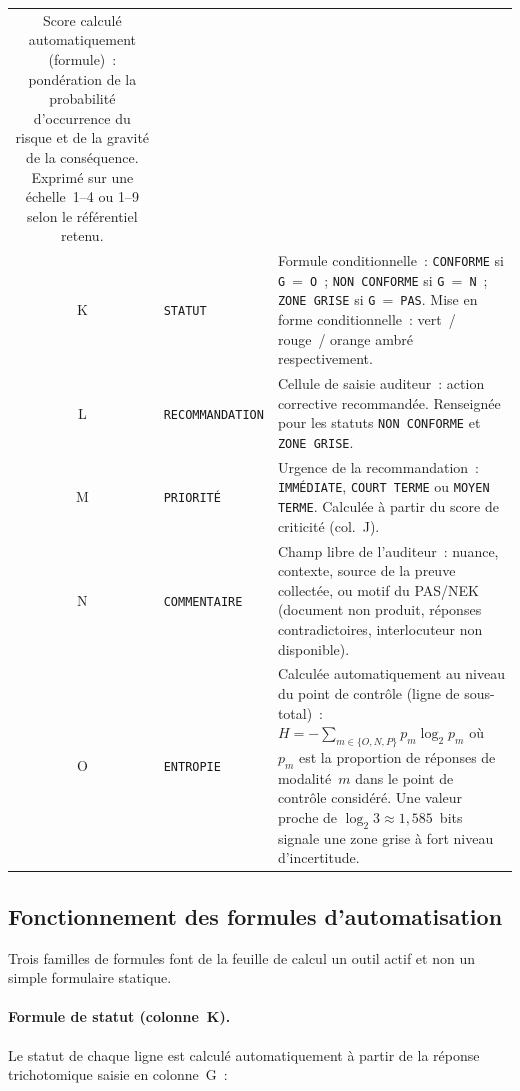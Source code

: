 \begin{table}[H]
\begin{tabular}{clp{7.5cm}}
  Score calculé automatiquement (formule)~: pondération de la
  probabilité d'occurrence du risque et de la gravité de la conséquence.
  Exprimé sur une échelle~1--4 ou 1--9 selon le référentiel retenu. \\
\addlinespace
K & \texttt{STATUT} &
  Formule conditionnelle~: \texttt{CONFORME} si \texttt{G}~=~\texttt{O}~;
  \texttt{NON~CONFORME} si \texttt{G}~=~\texttt{N}~;
  \texttt{ZONE~GRISE} si \texttt{G}~=~\texttt{PAS}.
  Mise en forme conditionnelle~: vert~/ rouge~/ orange ambré
  respectivement. \\
\addlinespace
L & \texttt{RECOMMANDATION} &
  Cellule de saisie auditeur~: action corrective recommandée. Renseignée
  pour les statuts \texttt{NON~CONFORME} et \texttt{ZONE~GRISE}. \\
\addlinespace
M & \texttt{PRIORITÉ} &
  Urgence de la recommandation~: \texttt{IMMÉDIATE}, \texttt{COURT TERME}
  ou \texttt{MOYEN TERME}. Calculée à partir du score de criticité
  (col.~J). \\
\addlinespace
N & \texttt{COMMENTAIRE} &
  Champ libre de l'auditeur~: nuance, contexte, source de la preuve
  collectée, ou motif du PAS/NEK (document non produit, réponses
  contradictoires, interlocuteur non disponible). \\
\addlinespace
O & \texttt{ENTROPIE} &
  Calculée automatiquement au niveau du point de contrôle (ligne de
  sous-total)~: $H = -\sum_{m \in \{O,N,P\}} p_m \log_2 p_m$ où $p_m$
  est la proportion de réponses de modalité~$m$ dans le point de contrôle
  considéré. Une valeur proche de $\log_2 3 \approx 1{,}585$~bits signale
  une zone grise à fort niveau d'incertitude. \\
\bottomrule
\end{tabular}
\end{table}

\subsection{Fonctionnement des formules d'automatisation}

Trois familles de formules font de la feuille de calcul un outil actif et non
un simple formulaire statique.

\paragraph{Formule de statut (colonne~K).}
Le statut de chaque ligne est calculé automatiquement à partir de la réponse
trichotomique saisie en colonne~G~:

